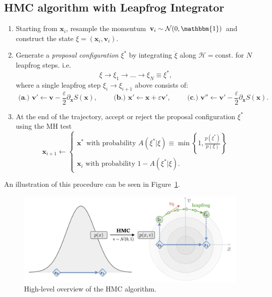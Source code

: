 \documentclass[a4paper,11pt]{article}
\newcommand{\x}{\mathbf{x}}
\newcommand{\p}{\mathbf{v}}
\newcommand{\acceptProb}{%
            A(\xi^{\ast}|\xi) \equiv \min\left\{1,
            \frac{p(\xi^{\ast})}{p(\xi)}\right\}
    }
\begin{document}
\subsection{\label{subsec:lfint}HMC algorithm with Leapfrog Integrator}
%
\begin{enumerate}
    \item Starting from \(\x_{i}\), resample the momentum \(\p_{i}\sim
        \mathcal{N} (0, \mathbbm{1})\) and construct the state \(\xi =
        (\x_i, \p_i)\).
    \item Generate a \emph{proposal configuration} \(\xi^{\ast}\) by
        integrating \(\dot\xi\) along \(\mathcal{H} = \mathrm{const.}\)
        for \(N\) leapfrog steps.
        i.e.
        \begin{equation}
            \xi \rightarrow \xi_{1}\rightarrow\ldots\rightarrow
            \xi_{N} \equiv \xi^{\ast},
        \end{equation}
        where a single leapfrog step \(\xi_{i} \rightarrow \xi_{i+1}\) above
        consists of:
        \begin{equation}
            \textbf{ (a.) }%
              \p'\leftarrow \p - \frac{\varepsilon}{2}\partial_{\x} S(\x),
            \quad\quad
            \textbf{ (b.) }%
              \x' \leftarrow \x + \varepsilon \p',
            \quad\quad
            \textbf{ (c.) }%
              \p'' \leftarrow \p' - \frac{\varepsilon}{2}\partial_{\x} S(\x).
        \end{equation}
    \item At the end of the trajectory, accept or reject the proposal
        configuration \(\xi^{\ast}\) using the MH test
        \begin{equation}
            \x_{i+1} \leftarrow
            \begin{cases}
                \x^{\ast}\text{ with probability } \acceptProb \\
                \x_{i}\text{ with probability } 1 - A(\xi^{\ast}|\xi).
            \end{cases}
        \end{equation}
\end{enumerate}
%
An illustration of this procedure can be seen in Figure~\ref{fig:hmc}.
%
\begin{figure}[htpb]
    \centering
    \includegraphics[width=\linewidth]{assets/hmc.pdf}
    \caption{\label{fig:hmc}High-level overview of the HMC algorithm.}
\end{figure}
%
\end{document}
